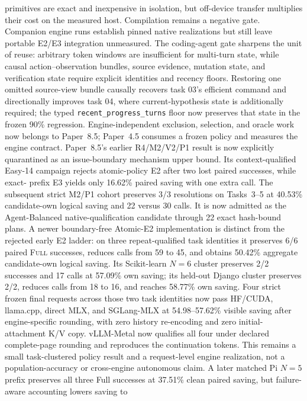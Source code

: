 \documentclass[11pt]{article}
\begin{document}
primitives are exact and inexpensive in isolation, but
off-device transfer multiplies their cost on the measured host.  Compilation
remains a negative gate. Companion engine runs establish pinned native
realizations but still leave portable E2/E3 integration unmeasured.  The
coding-agent gate sharpens the unit of reuse: arbitrary token windows are
insufficient for multi-turn state, while causal action--observation bundles,
source evidence, mutation state, and verification state require explicit
identities and recency floors.  Restoring one omitted source-view bundle
causally recovers task 03's efficient command and directionally improves task
04, where current-hypothesis state is additionally required; the typed
\texttt{recent\_progress\_turns} floor now preserves that state in the frozen
90\% regression.  Engine-independent exclusion, selection, and oracle work now
belongs to Paper~8.5; Paper~4.5 consumes a frozen policy and measures the engine
contract.  Paper~8.5's earlier R4/M2/V2/P1 result is now explicitly quarantined
as an issue-boundary mechanism upper bound.  Its context-qualified Easy-14
campaign rejects atomic-policy E2 after two lost paired successes, while exact-
prefix E3 yields only 16.62\% paired saving with one extra call.  The subsequent
strict M2/P1 cohort preserves 3/3 resolutions on Tasks~3--5 at 40.53\%
candidate-own logical saving and 22 versus 30 calls.  It is now admitted as the
Agent-Balanced native-qualification candidate through 22 exact hash-bound
plans.  A newer boundary-free Atomic-E2 implementation is distinct from the
rejected early E2 ladder: on three repeat-qualified task identities it
preserves 6/6 paired \textsc{Full} successes, reduces calls from 59 to 45, and
obtains 50.42\% aggregate candidate-own logical saving.  Its Scikit-learn
$N=6$ cluster preserves 2/2 successes and 17 calls at 57.09\% own saving; its
held-out Django cluster preserves 2/2, reduces calls from 18 to 16, and reaches
58.77\% own saving.  Four strict frozen final requests across those two task
identities now pass HF/CUDA, llama.cpp, direct MLX, and SGLang-MLX at 54.98--57.62\%
visible saving after engine-specific rounding, with zero history re-encoding
and zero initial-attachment K/V copy.  vLLM-Metal now qualifies all four under
declared complete-page rounding and reproduces the continuation tokens.
This remains a small task-clustered policy result and a request-level
engine realization, not a
population-accuracy or cross-engine autonomous claim.  A later matched Pi
$N=5$ prefix preserves all three Full successes at
37.51\% clean paired saving, but failure-aware accounting lowers saving to
\end{document}
